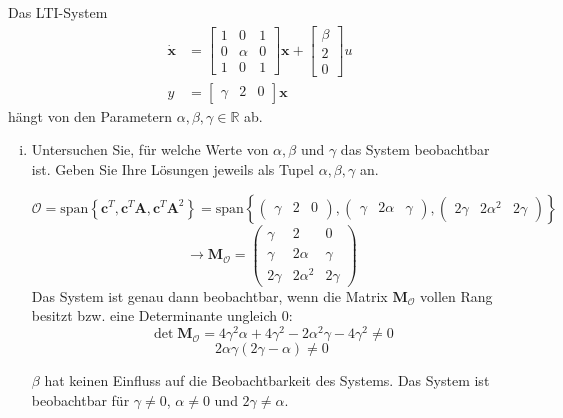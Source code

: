 \documentclass[crop=false]{standalone}
\begin{document}
\begin{task}
Das LTI-System
\[ 
\begin{aligned} \dot{\mathbf{x}} &=\left[\begin{array}{lll}{1} & {0} & {1} \\ {0} & {\alpha} & {0} \\ {1} & {0} & {1}\end{array}\right] \mathbf{x}+\left[\begin{array}{l}{\beta} \\ {2} \\ {0}\end{array}\right] u \\ y &=\left[\begin{array}{lll}{\gamma} & {2} & {0}\end{array}\right] \mathbf{x} \end{aligned}
 \]
hängt von den Parametern $\alpha, \beta, \gamma \in \mathbb{R}$ ab.
\begin{enumerate}[i.]
    \item Untersuchen Sie, für welche Werte von $\alpha, \beta$ und $\gamma$ das System beobachtbar ist. Geben Sie Ihre Lösungen jeweils als Tupel $\alpha, \beta, \gamma$ an.
\begin{solution}
\[ \mathcal{O} = \text{span}\left\{ \mathbf{c}^T,\mathbf{c}^T\mathbf{A},\mathbf{c}^T\mathbf{A}^2  \right\}=
\text{span}\left\{ \begin{pmatrix}
\gamma & 2 & 0
\end{pmatrix}, \begin{pmatrix}
\gamma & 2 \alpha & \gamma
\end{pmatrix},
\begin{pmatrix}
2 \gamma & 2 \alpha^2 & 2 \gamma
\end{pmatrix}\right\}\]
\[ \rightarrow \mathbf{M}_{\mathcal{O}} = \begin{pmatrix}
\gamma & 2 & 0 \\ \gamma & 2 \alpha & \gamma \\ 2 \gamma & 2 \alpha^2 & 2 \gamma
\end{pmatrix}\]
Das System ist genau dann beobachtbar, wenn die Matrix $\mathbf{M}_{\mathcal{O}}$ vollen Rang besitzt bzw. eine Determinante ungleich 0:
\[\det \mathbf{M}_{\mathcal{O}} = 4 \gamma^2 \alpha + 4 \gamma^2 - 2\alpha^2 \gamma - 4\gamma^2 \neq 0\]
\[2 \alpha \gamma \left( 2\gamma - \alpha \right) \neq 0\]

$\beta$ hat keinen Einfluss auf die Beobachtbarkeit des Systems. Das System ist beobachtbar für $\gamma \neq 0$, $\alpha \neq 0$ und $2 \gamma \neq \alpha$.


\end{solution}
\end{enumerate}
\end{task}
\end{document}
